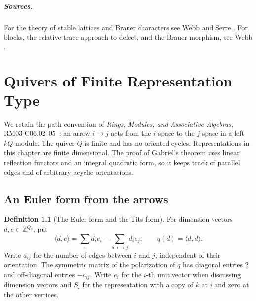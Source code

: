 \documentclass[11pt,oneside,openany]{book}
\theoremstyle{definition}
\newtheorem{definition}[theorem]{Definition}
\theoremstyle{remark}
\begin{document}
\paragraph{Sources.}
For the theory of stable lattices and Brauer characters see
Webb \cite[Sections~9.4--9.5 and 10.1--10.3]{webb} and
Serre \cite[Chapters~15--16 and 18]{serre-finrep}.
For blocks, the relative-trace approach to defect, and the
Brauer morphism, see Webb \cite[Sections~12.1--12.5]{webb}.
\chapter{Quivers of Finite Representation Type}

We retain the path convention of \emph{Rings, Modules, and Associative
Algebras}, RM03-C06.02--05~\cite[PDF pp.~14--15]{mg-rm03}: an
arrow \(i\to j\) acts from the \(i\)-space to the \(j\)-space in a
left \(kQ\)-module. The quiver \(Q\) is finite and has no oriented
cycles. Representations in this chapter are finite dimensional.
The proof of Gabriel's theorem uses linear reflection functors and
an integral quadratic form, so it keeps track of parallel edges
and of arbitrary acyclic orientations.

\section{An Euler form from the arrows}

\begin{definition}[The Euler form and the Tits form]
\label{res:QU01}
For dimension vectors \(d,e\in\mathbb Z^{Q_0}\), put
\[
 \langle d,e\rangle=\sum_i d_i e_i-\sum_{a:i\to j}d_i e_j,
 \qquad q(d)=\langle d,d\rangle.
\]
Write \(a_{ij}\) for the number of edges between \(i\) and \(j\),
independent of their orientation. The symmetric matrix of the
polarization of \(q\) has diagonal entries \(2\) and off-diagonal
entries \(-a_{ij}\). Write \(e_i\) for the \(i\)-th unit vector
when discussing dimension vectors and \(S_i\) for the representation
with a copy of \(k\) at \(i\) and zero at the other vertices.
\end{definition}
\end{document}
